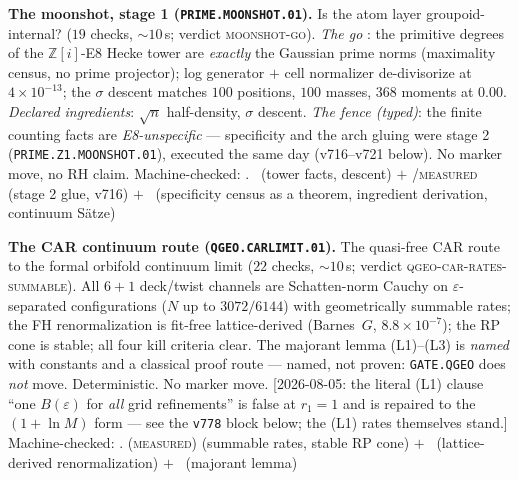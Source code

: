 \documentclass[11pt,a4paper]{article}
\theoremstyle{definition}
\begin{document}
\par\smallskip\noindent\textbf{The moonshot, stage 1
(\texttt{PRIME.MOONSHOT.01}).}
Is the atom layer groupoid-internal? ($19$ checks, ${\sim}10$\,s;
verdict \textsc{moonshot-go}).  \emph{The go} \mE: the primitive
degrees of the $\mathbb{Z}[i]$-E8 Hecke tower are \emph{exactly} the
Gaussian prime norms (maximality census, no prime projector); log
generator $+$ cell normalizer de-divisorize at $4\times10^{-13}$;
the $\sigma$ descent matches $100$ positions, $100$ masses, $368$
moments at $0.00$.  \emph{Declared ingredients}: $\sqrt n$
half-density, $\sigma$ descent.  \emph{The fence (typed)}: the
finite counting facts are \emph{E8-unspecific} --- specificity and
the arch gluing were stage 2 (\texttt{PRIME.Z1.MOONSHOT.01}),
executed the same day (v716--v721 below).  No
marker move, no RH claim.
Machine-checked: .
\mE\ (tower facts, descent) $+$ \mE/\textsc{measured} (stage 2 glue,
v716) $+$ \mO\ (specificity census as a theorem, ingredient
derivation, continuum S\"atze)
\par\smallskip

\par\smallskip\noindent\textbf{The CAR continuum route
(\texttt{QGEO.CARLIMIT.01}).}
The quasi-free CAR route to the formal orbifold continuum limit
($22$ checks, ${\sim}10$\,s; verdict
\textsc{qgeo-car-rates-summable}).  All $6{+}1$ deck/twist channels
are Schatten-norm Cauchy on $\varepsilon$-separated configurations
($N$ up to $3072/6144$) with geometrically summable rates; the FH
renormalization is fit-free lattice-derived (Barnes~$G$,
$8.8\times10^{-7}$); the RP cone is stable; all four kill criteria
clear.  The majorant lemma (L1)--(L3) is \emph{named} with constants
and a classical proof route --- named, not proven:
\texttt{GATE.QGEO} does \emph{not} move.  Deterministic.  No marker
move.  [2026-08-05: the literal (L1) clause ``one $B(\varepsilon)$
for \emph{all} grid refinements'' is false at $r_1=1$ and is
repaired to the $(1+\ln M)$ form --- see the \texttt{v778} block
below; the (L1) rates themselves stand.]
Machine-checked: .
(\textsc{measured}) (summable rates, stable RP cone) $+$ \mE\
(lattice-derived renormalization) $+$ \mO\ (majorant lemma)
\par\smallskip
\end{document}

